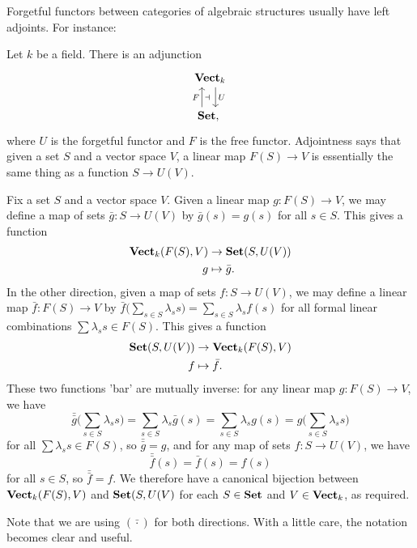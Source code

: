 \begin{example}
    Forgetful functors between categories of algebraic structures usually have left adjoints. For instance:
    \item Let $k$ be a field. There is an adjunction
        \begin{equation*}
        \begin{tikzcd}
            \bcat{Vect}_k \arrow[d, shift left=2, "U"] \\
            \bcat{Set,} \arrow[u, shift left=3, "F", "\dashv"'] \
        \end{tikzcd}
        \end{equation*}
    where $U$ is the forgetful functor and $F$ is the free functor. Adjointness says that given a set $S$ and a vector space $V$, a linear map $F(S)\to V$ is essentially the same thing as a function $S\to U(V)$.\par
    Fix a set $S$ and a vector space $V$. Given a linear map $g:F(S)\to V$, we may define a map of sets $\bar{g}: S\to U(V)$ by $\bar{g}(s)=g(s)$ for all $s\in S$. This gives a function
    \begin{align*}
    \mathbf{Vect}_k(F(S),V) &\to \mathbf{Set}(S,U(V))\\
        g &\mapsto \bar{g}.
    \end{align*}
    In the other direction, given a map of sets $f:S\to U(V)$, we may define a linear map $\bar{f}:F(S)\to V$ by $\bar{f}\Big( \sum_{s\in S}\lambda_s s\Big) =\sum_{s\in S}\lambda_sf(s)$ for all formal linear combinations $\sum \lambda_s s\in F(S)$. This gives a function
    \begin{align*}
        \mathbf{Set}(S, U(V)) &\to \mathbf{Vect}_k(F(S), V) \\
        f &\mapsto \bar{f}.
    \end{align*}
    These two functions 'bar' are mutually inverse: for any linear map $g:F(S)\to V$, we have
    $$\bar{\bar{g}}\Bigg( \sum\limits_{s\in S} \lambda_s s \Bigg) = \sum\limits_{s\in S} \lambda_s \bar{g}(s) = \sum\limits_{s\in S} \lambda_s g(s) = g\Bigg( \sum\limits_{s\in S} \lambda_s s \Bigg)$$
    for all $\sum \lambda_s s \in F(S)$, so $\bar{\bar{g}}=g$, and for any map of sets $f: S\to U(V)$, we have
    $$\bar{\bar{f}}(s)=\bar{f}(s)=f(s)$$
    for all $s\in S$, so $\bar{\bar{f}}=f$. We therefore have a canonical bijection between $\mathbf{Vect}_k(F(S), V)$ and $\mathbf{Set}(S, U(V)$ for each $S\in \mathbf{Set}$ and $V\in \mathbf{Vect}_k$, as required.
\end{example}
\begin{remark}
    Note that we are using $(\bar{\cdot})$ for both directions. With a little care, the notation becomes clear and useful.
\end{remark}
